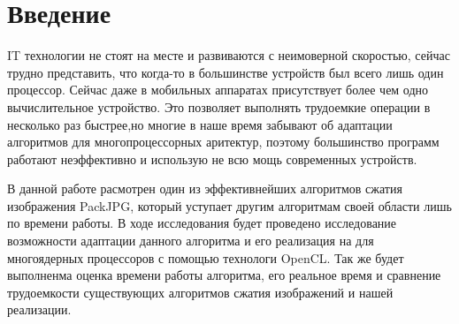 \documentclass{matmex-diploma-custom}
\begin{document}
\maketitle
\tableofcontents
\newpage
\section*{Введение}

    IT технологии не стоят на  месте и развиваются с неимоверной скоростью, сейчас трудно представить, что когда-то в большинстве устройств был всего лишь один процессор. Сейчас даже в мобильных аппаратах присутствует более чем одно вычислительное устройство. Это позволяет выполнять трудоемкие операции в несколько раз быстрее,но многие в наше время забывают об адаптации алгоритмов для многопроцессорных аритектур, поэтому большинство программ работают неэффективно и использую не всю мощь современных устройств.

 В данной работе расмотрен один из эффективнейших алгоритмов сжатия изображения PackJPG, который уступает другим алгоритмам своей области лишь по времени работы. В ходе исследования будет проведено исследование возможности адаптации данного алгоритма и его реализация на для многоядерных процессоров с помощью технологи OpenCL. Так же будет выполненма оценка времени работы алгоритма, его реальное время и сравнение трудоемкости существующих алгоритмов сжатия изображений и  нашей реализации.
\end{document}
